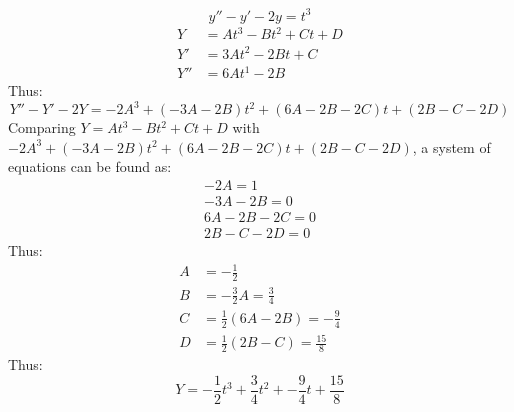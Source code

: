 \documentclass[12pt]{article}
\begin{document}
\begin{example}
  \begin{equation*}
    y'' - y' - 2y = t^3
  \end{equation*}
  \begin{align*}
    Y &= At^3 - Bt^2 + Ct + D \\
    Y' &= 3At^2 - 2Bt + C \\
    Y'' &= 6At^1 - 2B
  \end{align*}
  Thus:
  \begin{equation*}
    Y'' - Y' - 2Y = -2A^3 + \left(-3A-2B\right)t^2 + (6A-2B-2C)t + (2B-C-2D)
  \end{equation*}
  Comparing $Y = At^3 - Bt^2 + Ct + D$ with $-2A^3 + \left(-3A-2B\right)t^2 + (6A-2B-2C)t + (2B-C-2D)$, a system of equations can be found as:
  \begin{gather*}
    -2A = 1 \\
    -3A-2B = 0 \\
    6A - 2B - 2C = 0 \\
    2B - C - 2D = 0
  \end{gather*}
  Thus:
  \begin{align*}
    A &= - \frac{1}{2} \\
    B &= - \frac{3}{2}A = \frac{3}{4} \\
    C &= \frac{1}{2}(6A-2B) = -\frac{9}{4} \\
    D &= \frac{1}{2}(2B-C) = \frac{15}{8}
  \end{align*}
  Thus:
  \begin{equation*}
    Y = - \frac{1}{2}t^3 + \frac{3}{4}t^2 + -\frac{9}{4}t + \frac{15}{8}
  \end{equation*}
\end{example}
\end{document}
